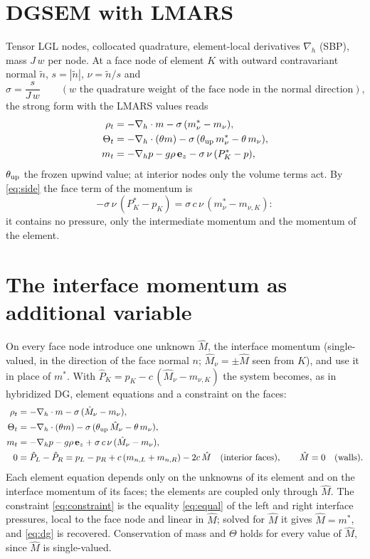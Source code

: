 \documentclass[11pt,a4paper]{article}
\begin{document}
\section{DGSEM with LMARS}
Tensor LGL nodes, collocated quadrature, element-local derivatives $\nabla_h$ (SBP), mass $J\,w$ per node. At a face node of
element $K$ with outward contravariant normal $\tilde n$, $s=|\tilde n|$, $\nu=\tilde n/s$ and
\[
\sigma=\frac{s}{J\,w}\qquad(w\text{ the quadrature weight of the face node in the normal direction}),
\]
the strong form with the LMARS values reads
\begin{align}
\rho_t&=-\nabla_h\cdot m-\sigma\,(m^*_\nu-m_\nu),\nonumber\\
\Theta_t&=-\nabla_h\cdot(\theta m)-\sigma\,(\theta_{\rm up}\,m^*_\nu-\theta\,m_\nu),\label{eq:dg}\\
m_t&=-\nabla_hp-g\rho\,\mathbf e_z-\sigma\,\nu\,(P_K^*-p),\nonumber
\end{align}
$\theta_{\rm up}$ the frozen upwind value; at interior nodes only the volume terms act. By \eqref{eq:side} the face term of the momentum is
\[
-\sigma\,\nu\,(P_K^*-p_K)=\sigma\,c\,\nu\,(m^*_\nu-m_{\nu,K}):
\]
it contains no pressure, only the intermediate momentum and the momentum of the element.

\section{The interface momentum as additional variable}
On every face node introduce one unknown $\hat M$, the interface momentum (single-valued, in the direction of the face normal
$n$; $\hat M_\nu=\pm\hat M$ seen from $K$), and use it in place of $m^*$. With $\hat P_K=p_K-c\,(\hat M_\nu-m_{\nu,K})$ the system becomes, as in
hybridized DG, element equations and a constraint on the faces:
\begin{align}
\rho_t&=-\nabla_h\cdot m-\sigma\,(\hat M_\nu-m_\nu),\nonumber\\
\Theta_t&=-\nabla_h\cdot(\theta m)-\sigma\,(\theta_{\rm up}\,\hat M_\nu-\theta\,m_\nu),\label{eq:hdg}\\
m_t&=-\nabla_hp-g\rho\,\mathbf e_z+\sigma\,c\,\nu\,(\hat M_\nu-m_\nu),\nonumber\\
0&=\hat P_L-\hat P_R=p_L-p_R+c\,(m_{n,L}+m_{n,R})-2c\,\hat M\quad(\text{interior faces}),\qquad \hat M=0\quad(\text{walls}).\label{eq:constraint}
\end{align}
Each element equation depends only on the unknowns of its element and on the interface momentum of its faces; the
elements are coupled only through $\hat M$. The constraint \eqref{eq:constraint} is the equality \eqref{eq:equal} of the left and right interface
pressures, local to the face node and linear in $\hat M$; solved for $\hat M$ it gives $\hat M=m^*$, and \eqref{eq:dg} is recovered. Conservation of
mass and $\Theta$ holds for every value of $\hat M$, since $\hat M$ is single-valued.
\end{document}
